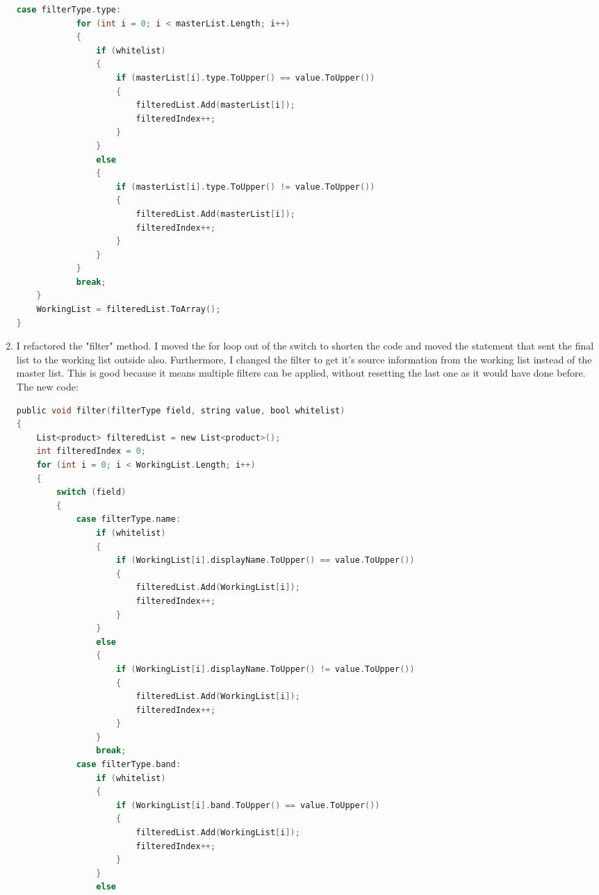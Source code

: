 ﻿\documentclass{article}
\begin{document}
\begin{enumerate}
\begin{lstlisting}[language=C]
        case filterType.type:
            for (int i = 0; i < masterList.Length; i++)
            {
                if (whitelist)
                {
                    if (masterList[i].type.ToUpper() == value.ToUpper())
                    {
                        filteredList.Add(masterList[i]);
                        filteredIndex++;
                    }
                }
                else
                {
                    if (masterList[i].type.ToUpper() != value.ToUpper())
                    {
                        filteredList.Add(masterList[i]);
                        filteredIndex++;
                    }
                }
            }
            break;
    }
    WorkingList = filteredList.ToArray();
}
        \end{lstlisting}
        \item I refactored the "filter" method.
        I moved the for loop out of the switch to shorten the code and moved the statement that sent the final list to the working list outside also.
        Furthermore, I changed the filter to get it's source information from the working list instead of the master list.
        This is good because it means multiple filters can be applied, without resetting the last one as it would have done before.
        The new code:
        \begin{lstlisting}[language=C]
public void filter(filterType field, string value, bool whitelist)
{
    List<product> filteredList = new List<product>();
    int filteredIndex = 0;
    for (int i = 0; i < WorkingList.Length; i++)
    {
        switch (field)
        {
            case filterType.name:
                if (whitelist)
                {
                    if (WorkingList[i].displayName.ToUpper() == value.ToUpper())
                    {
                        filteredList.Add(WorkingList[i]);
                        filteredIndex++;
                    }
                }
                else
                {
                    if (WorkingList[i].displayName.ToUpper() != value.ToUpper())
                    {
                        filteredList.Add(WorkingList[i]);
                        filteredIndex++;
                    }
                }
                break;
            case filterType.band:
                if (whitelist)
                {
                    if (WorkingList[i].band.ToUpper() == value.ToUpper())
                    {
                        filteredList.Add(WorkingList[i]);
                        filteredIndex++;
                    }
                }
                else

\end{lstlisting}
\end{enumerate}
\end{document}
